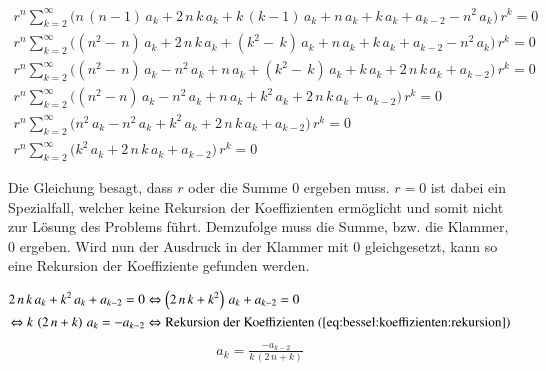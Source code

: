\begin{align}
	r^n
	\sum_{k=2}^{\infty}
	\biggl(
	n \, \left( n - 1 \right) \, a_k 
	+
	2 \, n \, k \, a_k
	+
	k \, \left( k - 1 \right) \, a_k
	+
	n \, a_k
	+
	k \, a_k
	+
	a_{k - 2}
	-
	n^2 \, a_k
	\biggr)
	\, r^k
	= 0 
	\label{eq:bessel:summe:zusammengefasst}
	\\
	\nonumber
	r^n
	\sum_{k=2}^{\infty}
	\biggl(
	\left( n^2 - \, n \right) \, a_k 
	+
	2 \, n \, k \, a_k
	+
	\left( k^2 - \, k \right) \, a_k
	+
	n \, a_k
	+
	k \, a_k
	+
	a_{k - 2}
	-
	n^2 \, a_k
	\biggr)
	\, r^k
	= 0 
	\\
	\nonumber
	r^n
	\sum_{k=2}^{\infty}
	\biggl(
	\left( n^2 - \, n \right) \, a_k 
	-
	n^2 \, a_k
	+
	n \, a_k
	+
	\left( k^2 - \, k \right) \, a_k
	+
	k \, a_k
	+
	2 \, n \, k \, a_k
	+
	a_{k - 2}
	\biggr)
	\, r^k
	= 0 
	\\
	\nonumber
	r^n
	\sum_{k=2}^{\infty}
	\biggl(
	\left( n^2 - n \right) \, a_k 
	-
	n^2 \, a_k
	+
	n \, a_k
	+
	k^2 \, a_k
	+
	2 \, n \, k \, a_k
	+
	a_{k - 2}
	\biggr)
	\, r^k
	= 0 
	\\
	\nonumber
	r^n
	\sum_{k=2}^{\infty}
	\biggl(
	n^2 \, a_k 
	-
	n^2 \, a_k
	+
	k^2 \, a_k
	+
	2 \, n \, k \, a_k
	+
	a_{k - 2}
	\biggr)
	\, r^k
	= 0 
	\\
	r^n
	\sum_{k=2}^{\infty}
	\biggl(
	k^2 \, a_k
	+
	2 \, n \, k \, a_k
	+
	a_{k - 2}
	\biggr)
	\, r^k
	= 0
	\label{eq:bessel:summe:zusammengefasst:vereinfacht}
\end{align}
\begin{normalsize}
Die Gleichung  besagt,
dass $r$ oder die Summe $0$ ergeben muss.
$r = 0$ ist dabei ein Spezialfall, welcher keine Rekursion der Koeffizienten erm\"oglicht und somit nicht zur L\"osung des Problems f\"uhrt.
Demzufolge muss die Summe, \acs{bzw.} die Klammer, $0$ ergeben.
Wird nun der Ausdruck in der Klammer mit $0$ gleichgesetzt,
kann so eine Rekursion der Koeffiziente gefunden werden.
\end{normalsize}
\begin{align*}
	2 \, n \, k \, a_k
	+
	k^2 \, a_k
	+
	a_{k - 2}
	= 0
	&\Leftrightarrow
	\left(
	2 \, n \, k 
	+
	k^2 
	\right)
	\, a_k
	+
	a_{k - 2}
	= 0 \\
	\Leftrightarrow
	k \,
	\left(
	2 \, n
	+
	k
	\right)
	\, a_k
	= -a_{k - 2}
	&\Leftrightarrow
	\text{Rekursion der Koeffizienten \refeq{eq:bessel:koeffizienten:rekursion}}
\end{align*}
\begin{align}
	a_k
	=
	\frac
	{
		-a_{k - 2}
	}{
		k \, \left( 2 \, n + k \right)	
	}
	\label{eq:bessel:koeffizienten:rekursion}
\end{align}
